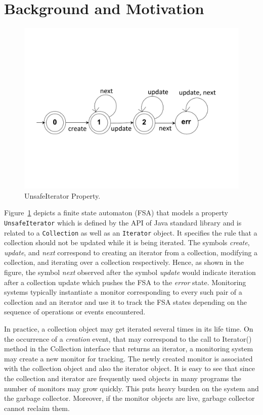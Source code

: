 \section{Background and Motivation}
\label{sec:motivation}

\begin{figure}[t]
\centering
  \includegraphics[scale=0.3, trim=0 5cm 0 6cm]{./images/unsafeiterator.pdf}
  \caption[UnsafeIterator Property FSA]{UnsafeIterator Property.}
  \label{fig:unsafeiteratorfsa}
\end{figure}

Figure~\ref{fig:unsafeiteratorfsa} depicts a finite state automaton (FSA) that 
models a property \texttt{UnsafeIterator} which is defined by the API of Java 
standard library and is related to a \texttt{Collection} as well as an 
\texttt{Iterator} object. It specifies the rule that a collection should not be 
updated while it is being iterated. The symbols \textit{create}, 
\textit{update}, and \textit{next} correspond to creating an iterator from a 
collection, modifying a collection, and iterating over a collection 
respectively. Hence, as shown in the figure, the symbol \textit{next} observed 
after the symbol \textit{update} would indicate iteration after a collection 
update which pushes the FSA to the \textit{error} state. Monitoring systems 
typically instantiate a monitor corresponding to every such pair of a collection 
and an iterator and use it to track the FSA states depending on the sequence of 
operations or events encountered.

In practice, a collection object may get iterated several times in its life 
time. On the occurrence of a \textit{creation} event, that may correspond to the 
call to \textmd{Iterator()} method in the \textmd{Collection} interface that 
returns an iterator, a monitoring system may create a new monitor for tracking. 
The newly created monitor is associated with the collection object and also the 
iterator object. It is easy to see that since the collection and iterator are 
frequently used objects in many programs the number of monitors may grow 
quickly. This puts heavy burden on the system and the garbage collector. 
Moreover, if the monitor objects are live, garbage collector cannot reclaim 
them.

